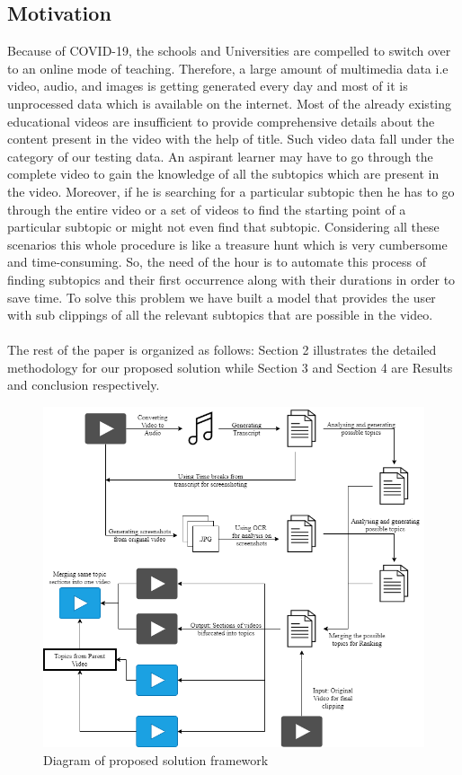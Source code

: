 \documentclass[conference]{IEEEtran}
\begin{document}
\subsection*{\textbf{Motivation}}
Because of COVID-19, the schools and Universities are compelled to switch over to an online mode of teaching. Therefore, a large amount of multimedia data i.e video, audio, and images is getting generated every day and most of it is unprocessed data which is available on the internet. Most of the already existing educational videos are insufficient to provide comprehensive details about the content present in the video with the help of title. Such video data fall under the category of our testing data. An aspirant learner may have to go through the complete video to gain the knowledge of all the subtopics which are present in the video. Moreover, if he is searching for a particular subtopic then he has to go through the entire video or a set of videos to find the starting point of a particular subtopic or might not even find that subtopic. Considering all these scenarios this whole procedure is like a treasure hunt which is very cumbersome and time-consuming. So, the need of the hour is to automate this process of finding subtopics and their first occurrence along with their durations in order to save time. To solve this problem we have built a model that provides the user with sub clippings of all the relevant subtopics that are possible in the video.\\
\\
The rest of the paper is organized as follows: Section 2 illustrates the detailed methodology for our proposed solution while Section 3 and Section 4 are Results and conclusion respectively.


\begin{figure}[h]
    \centering
    \includegraphics[width=\textwidth]{image2.png}
    \caption{Diagram of proposed solution framework}
    \label{fig:inputs_loss_mask}
\end{figure}
\end{document}
